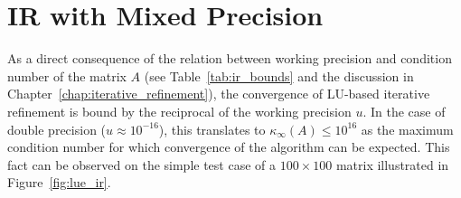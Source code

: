 \section{IR with Mixed Precision}
\label{sec:mixed_precision}

As a direct consequence of the relation between working precision and condition number of the matrix $A$ (see Table~\hyperref[tab:ir_bounds]{\ref{tab:ir_bounds}} and the discussion in Chapter~\hyperref[chap:iterative_refinement]{\ref{chap:iterative_refinement}}), the convergence of LU-based iterative refinement is bound by the reciprocal of the working precision $u$. In the case of double precision ($u \approx 10^{-16}$), this translates to $\kappa_\infty(A) \leq 10^{16}$ as the maximum condition number for which convergence of the algorithm can be expected. This fact can be observed on the simple test case of a $100 \times 100$ matrix illustrated in Figure~\hyperref[fig:lue_ir]{\ref{fig:lue_ir}}.

